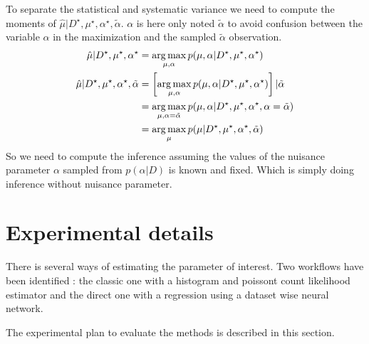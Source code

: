 To separate the statistical and systematic variance we need to compute the moments of $\hat \mu | D^\star, \mu^\star, \alpha^\star, \tilde \alpha$.
$\alpha$ is here only noted $\tilde \alpha$ to avoid confusion between the variable $\alpha$ in the maximization and the sampled $\tilde \alpha$ observation. 
\begin{align}
\hat \mu | D^\star, \mu^\star, \alpha^\star & = \operatorname*{arg\,max}_{\mu, \alpha} p(\mu, \alpha| D^\star, \mu^\star, \alpha^\star) \\
\hat \mu | D^\star, \mu^\star, \alpha^\star, \tilde \alpha & = \left[ \operatorname*{arg\,max}_{\mu, \alpha} p(\mu, \alpha| D^\star, \mu^\star, \alpha^\star) \right] | \tilde \alpha \\
	& = \operatorname*{arg\,max}_{\mu, \alpha=\tilde \alpha} p(\mu, \alpha| D^\star, \mu^\star, \alpha^\star, \alpha = \tilde \alpha) \\
	& = \operatorname*{arg\,max}_{\mu} p(\mu | D^\star, \mu^\star, \alpha^\star, \tilde \alpha) \\
\end{align}
So we need to compute the inference assuming the values of the nuisance parameter $\alpha$ sampled from $p(\alpha|D)$ is known and fixed.
Which is simply doing inference without nuisance parameter.












\section{Experimental details} %
\label{sec:experimental_details}





There is several ways of estimating the parameter of interest.
Two workflows have been identified : the classic one with a histogram and poissont count likelihood estimator and the direct one with a regression using a dataset wise neural network.

The experimental plan to evaluate the methods is described in this section.









